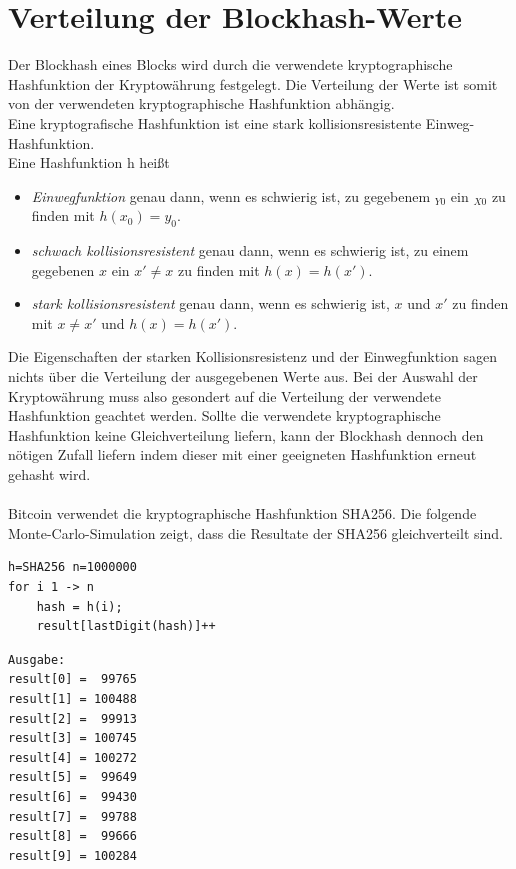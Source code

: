\section{Verteilung der Blockhash-Werte}\label{btc_distribution}
Der Blockhash eines Blocks wird durch die verwendete kryptographische Hashfunktion der Kryptowährung festgelegt. Die Verteilung der Werte ist somit von der verwendeten kryptographische Hashfunktion abhängig.\\
Eine kryptografische Hashfunktion ist eine stark kollisionsresistente Einweg-Hashfunktion.\\
Eine Hashfunktion h heißt
\begin{itemize}
\item \textit{Einwegfunktion} genau dann, wenn es schwierig ist, zu gegebenem $_{Y0}$ ein $_{X0}$ zu finden mit $h(x_{0}) = y_{0}$.
\item \textit{schwach kollisionsresistent} genau dann, wenn es schwierig ist, zu einem gegebenen $x$ ein $x' \neq x$ zu finden mit $h(x) = h(x')$.
\item \emph{stark kollisionsresistent} genau dann, wenn es schwierig ist, $x$ und $x'$ zu finden
mit $x \neq x'$ und $h(x) = h(x')$.
\end{itemize}Die Eigenschaften der starken Kollisionsresistenz und der Einwegfunktion sagen nichts über die Verteilung der ausgegebenen Werte aus. Bei der Auswahl der Kryptowährung muss also gesondert auf die Verteilung der verwendete Hashfunktion geachtet werden. Sollte die verwendete kryptographische Hashfunktion keine Gleichverteilung liefern, kann der Blockhash dennoch den nötigen Zufall liefern indem dieser mit einer geeigneten Hashfunktion erneut gehasht wird.\\\\
Bitcoin verwendet die kryptographische Hashfunktion SHA256.
Die folgende Monte-Carlo-Simulation zeigt, dass die Resultate der SHA256 gleichverteilt sind.
\begin{verbatim}
h=SHA256 n=1000000
for i 1 -> n
    hash = h(i);
    result[lastDigit(hash)]++
\end{verbatim}
\begin{minipage}{0.5\textwidth}
\begin{verbatim}
Ausgabe:
result[0] =  99765
result[1] = 100488
result[2] =  99913
result[3] = 100745
result[4] = 100272
result[5] =  99649
result[6] =  99430
result[7] =  99788
result[8] =  99666
result[9] = 100284
\end{verbatim}
\end{minipage}
